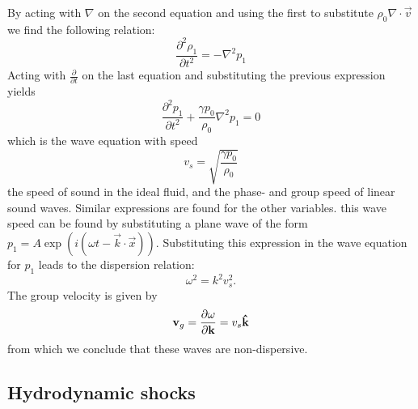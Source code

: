 {\centering 
\noindent {}
\par}
By acting with $\nabla$ on the second equation and using the first to substitute $\rho_0 \nabla \cdot \vec{v}$ we find the following relation:
\begin{equation*}
	\frac{\partial^2 \rho_1}{\partial t^2} = -\nabla^2 p_1
\end{equation*}
Acting with $ \frac{\partial}{\partial t}$ on the last equation and substituting the previous expression yields
\begin{equation*}
	\frac{\partial^2 p_1}{\partial t^2} + \frac{\gamma p_0}{\rho_0} \nabla^2 p_1 = 0
\end{equation*}
which is the wave equation with speed
\begin{equation}
v_s = \sqrt{ \frac{\gamma p_0}{\rho_0} }
\label{eq:sound-speed}
\end{equation}
the speed of sound in the ideal fluid, and the phase- and group speed of linear sound waves.
Similar expressions are found for the other variables. 
this wave speed can be found by substituting a plane wave of the form $p_1 = A \exp \left( i(\omega t - \vec{k}\cdot\vec{x}) \right) $. Substituting this expression in the wave equation for $p_1$ leads to the dispersion relation:
\begin{equation}
	\omega^2 = k^2v_s^2.
\end{equation}
The group velocity is given by
\begin{equation}
	\mathbf{v}_{g} = \frac{\partial \omega}{\partial \mathbf{k}} = v_s\mathbf{\hat{k}}
	\label{eq:group-velocity}
\end{equation}
from which we conclude that these waves are non-dispersive.

\subsection{Hydrodynamic shocks}

